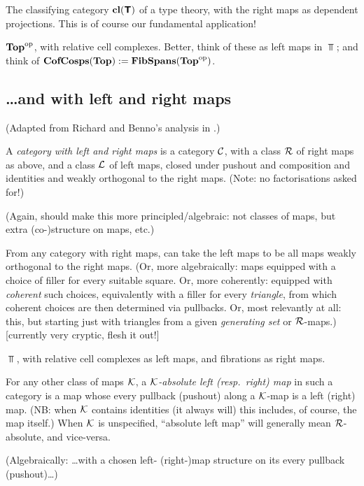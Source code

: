 \documentclass{amsart}
\begin{document}
\begin{example}
The classifying category $\mathbf{cl}(\textbf{\textsf{T}})$ of a type theory, with the right maps as dependent projections.  This is of course our fundamental application!
\end{example}

\begin{example}
$\mathbf{Top}^{\mathrm{op}}$, with relative cell complexes.  Better, think of these as left maps in $\Top$; and think of $\mathbf{CofCosps}(\mathbf{Top}) := \mathbf{FibSpans}(\mathbf{Top}^{\mathrm{op}})$.
\end{example}

\subsection{\ldots and with left and right maps}

(Adapted from Richard and Benno's analysis in \cite{garner-van-den-berg}.)

\begin{definition}A \emph{category with left and right maps} is a category $\mathcal{C}$, with a class $\mathcal{R}$ of right maps as above, and a class $\mathcal{L}$ of left maps, closed under pushout and composition and identities and weakly orthogonal to the right maps.  (Note: no factorisations asked for!) 

(Again, should make this more principled/algebraic: not classes of maps, but extra (co-)structure on maps, etc.)
\end{definition}

\begin{example} \label{ex:left-maps-from-right} From any category with right maps, can take the left maps to be all maps weakly orthogonal to the right maps.  (Or, more algebraically: maps equipped with a choice of filler for every suitable square.  Or, more coherently: equipped with \emph{coherent} such choices, equivalently with a filler for every \emph{triangle}, from which coherent choices are then determined via pullbacks.  Or, most relevantly at all: this, but starting just with triangles from a given \emph{generating set} or $\mathcal{R}$-maps.) [currently very cryptic, flesh it out!]
\end{example}

\begin{example}$\Top$, with relative cell complexes as left maps, and fibrations as right maps.
\end{example}

\begin{definition}For any other class of maps $\mathcal{K}$, a \emph{$\mathcal{K}$-absolute left (resp.\ right) map} in such a category is a map whose every pullback (pushout) along a $\mathcal{K}$-map is a left (right) map.  (NB: when $\mathcal{K}$ contains identities (it always will) this includes, of course, the map itself.)  When $\mathcal{K}$ is unspecified, ``absolute left map'' will generally mean $\mathcal{R}$-absolute, and vice-versa.

(Algebraically: \ldots with a chosen left- (right-)map structure on its every pullback (pushout)\ldots)  
\end{definition}
\end{document}
